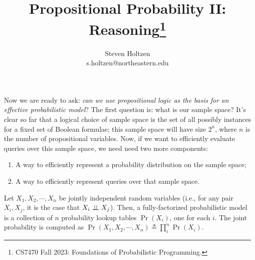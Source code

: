 \documentclass{tufte-handout}
\title{Propositional Probability II: Reasoning\thanks{CS7470 Fall 2023: Foundations of Probabilistic Programming.}}
\author[]{Steven Holtzen\\s.holtzen@northeastern.edu}
\begin{document}
\maketitle%

Now we are ready to ask: \emph{can we use
propositional logic as the basis for an effective probabilistic model}?
The first question is: what is our sample space? It's clear so far that a logical 
choice of sample space is the set of all possibly instances for a fixed set 
of Boolean formulae; this sample space will have size $2^n$, where $n$ is the number 
of propositional variables.
Now, if we want to efficiently evaluate queries over this sample space, we need
need two more components:
\begin{enumerate}
    \item A way to efficiently represent a probability distribution on the sample space;
    \item A way to efficiently represent queries over that sample space.
\end{enumerate}



\begin{definition}
    Let $X_1, X_2, \cdots, X_n$ be jointly independent random variables (i.e.,
    for any pair $X_i, X_j$, it is the case that $X_i \perp \!\!\! \perp X_j$). Then, a
    fully-factorized probabilistic model is a collection of $n$ probability
    lookup tables $\Pr(X_i)$, one for each $i$. The joint probability is computed 
    as $\Pr(X_1, X_2, \cdots, X_n) \triangleq \prod_i^n \Pr(X_i)$.
\end{definition}

\end{document}

